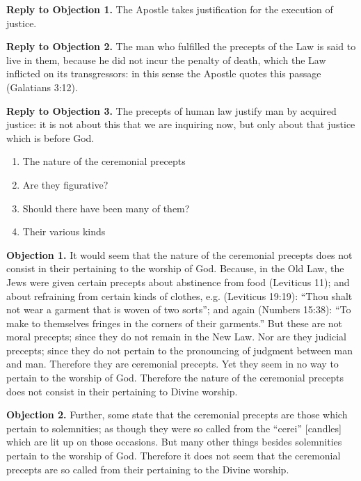 \textbf{Reply to Objection 1.} The Apostle takes justification for the execution of justice.

\textbf{Reply to Objection 2.} The man who fulfilled the precepts of the Law is said to live in them, because he did not incur the penalty of death, which the Law inflicted on its transgressors: in this sense the Apostle quotes this passage (Galatians 3:12).

\textbf{Reply to Objection 3.} The precepts of human law justify man by acquired justice: it is not about this that we are inquiring now, but only about that justice which is before God.


\begin{enumerate}

\item  The nature of the ceremonial precepts 
\item  Are they figurative? 
\item  Should there have been many of them? 
\item  Their various kinds 
\end{enumerate}


\textbf{Objection 1.} It would seem that the nature of the ceremonial precepts does not consist in their pertaining to the worship of God. Because, in the Old Law, the Jews were given certain precepts about abstinence from food (Leviticus 11); and about refraining from certain kinds of clothes, e.g. (Leviticus 19:19): ``Thou shalt not wear a garment that is woven of two sorts''; and again (Numbers 15:38): ``To make to themselves fringes in the corners of their garments.'' But these are not moral precepts; since they do not remain in the New Law. Nor are they judicial precepts; since they do not pertain to the pronouncing of judgment between man and man. Therefore they are ceremonial precepts. Yet they seem in no way to pertain to the worship of God. Therefore the nature of the ceremonial precepts does not consist in their pertaining to Divine worship.

\textbf{Objection 2.} Further, some state that the ceremonial precepts are those which pertain to solemnities; as though they were so called from the ``cerei'' [candles] which are lit up on those occasions. But many other things besides solemnities pertain to the worship of God. Therefore it does not seem that the ceremonial precepts are so called from their pertaining to the Divine worship.

